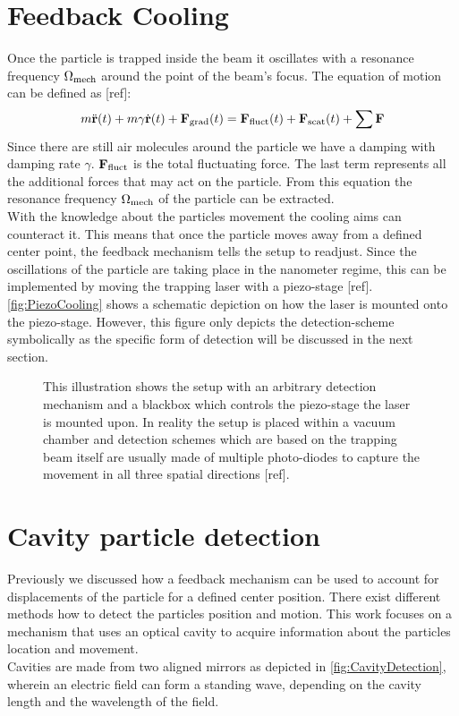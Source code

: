 \section{Feedback Cooling}
Once the particle is trapped inside the beam it oscillates with a resonance frequency $\de{\Omega}{mech}$ around the point of the beam's focus. The equation of motion can be defined as [ref]:
\begin{equation}
	m\ddot{\vc{r}}(t)+m\gamma\dot{\vc{r}}(t)+\field{F}{grad}(t)=\field{F}{fluct}(t)+\field{F}{scat}(t)+\sum\limits\vc{F}
\end{equation}
Since there are still air molecules around the particle we have a damping with damping rate $\gamma$. $\field{F}{fluct}$ is the total fluctuating force. The last term represents all the additional forces that may act on the particle. From this equation the resonance frequency $\de{\Omega}{mech}$ of the particle can be extracted.\\
With the knowledge about the particles movement the cooling aims can counteract it. This means that once the particle moves away from a defined center point, the feedback mechanism tells the setup to readjust. Since the oscillations of the particle are taking place in the nanometer regime, this can be implemented by moving the trapping laser with a piezo-stage [ref]. \autoref{fig:PiezoCooling} shows a schematic depiction on how the laser is mounted onto the piezo-stage. However, this figure only depicts the detection-scheme symbolically as the specific form of detection will be discussed in the next section.
\begin{figure}[H]
    
    \caption{This illustration shows the setup with an arbitrary detection mechanism and a blackbox which controls the piezo-stage the laser is mounted upon. In reality the setup is placed within a vacuum chamber and detection schemes which are based on the trapping beam itself are usually made of multiple photo-diodes to capture the movement in all three spatial directions [ref].}
    \label{fig:PiezoCooling}
\end{figure}

\section{Cavity particle detection}\label{ChapCavityDetection}
Previously we discussed how a feedback mechanism can be used to account for displacements of the particle for a defined center position. There exist different methods how to detect the particles position and motion. This work focuses on a mechanism that uses an optical cavity to acquire information about the particles location and movement.\\
Cavities are made from two aligned mirrors as depicted in \autoref{fig:CavityDetection}, wherein an electric field can form a standing wave, depending on the cavity length and the wavelength of the field.

